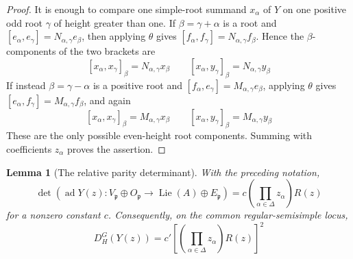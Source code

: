 \documentclass[11pt]{amsart}
\newtheorem{lemma}[lemma]{Lemma}
\theoremstyle{definition}
\theoremstyle{remark}
\newcommand{\Lie}{\operatorname{Lie}}
\newcommand{\ad}{\operatorname{ad}}
\newcommand{\p}{\mathfrak p}
\begin{document}
\begin{proof}
It is enough to compare one simple-root summand $x_\alpha$ of $Y$ on one
positive odd root $\gamma$ of height greater than one.  If
$\beta=\gamma+\alpha$ is a root and
$[e_\alpha,e_\gamma]=N_{\alpha,\gamma}e_\beta$, then applying $\theta$ gives
$[f_\alpha,f_\gamma]=N_{\alpha,\gamma}f_\beta$.  Hence the $\beta$-components
of the two brackets are
\[
 [x_\alpha,x_\gamma]_\beta
   =N_{\alpha,\gamma}x_\beta
 \qquad
 [x_\alpha,y_\gamma]_\beta
   =N_{\alpha,\gamma}y_\beta
\]
If instead $\beta=\gamma-\alpha$ is a positive root and
$[f_\alpha,e_\gamma]=M_{\alpha,\gamma}e_\beta$, applying $\theta$ gives
$[e_\alpha,f_\gamma]=M_{\alpha,\gamma}f_\beta$, and again
\[
 [x_\alpha,x_\gamma]_\beta
   =M_{\alpha,\gamma}x_\beta
 \qquad
 [x_\alpha,y_\gamma]_\beta
   =M_{\alpha,\gamma}y_\beta
\]
These are the only possible even-height root components.  Summing with
coefficients $z_\alpha$ proves the assertion.
\end{proof}

\begin{lemma}[The relative parity determinant]\label{lem:relative-parity-determinant}
With the preceding notation,
\begin{equation}\label{eq:p-parity-determinant}
 \det\left(
 \ad Y(z):V_\p\oplus O_\p
 \longrightarrow \Lie(A)\oplus E_\p
 \right)
 =c\left(\prod_{\alpha\in\Delta}z_\alpha\right)R(z)
\end{equation}
for a nonzero constant $c$.  Consequently, on the common regular-semisimple locus,
\begin{equation}\label{eq:relative-discriminant-parity}
 D_H^G(Y(z))
 =c'\left[
       \left(\prod_{\alpha\in\Delta}z_\alpha\right)R(z)
      \right]^2
\end{equation}
\end{lemma}
\end{document}
